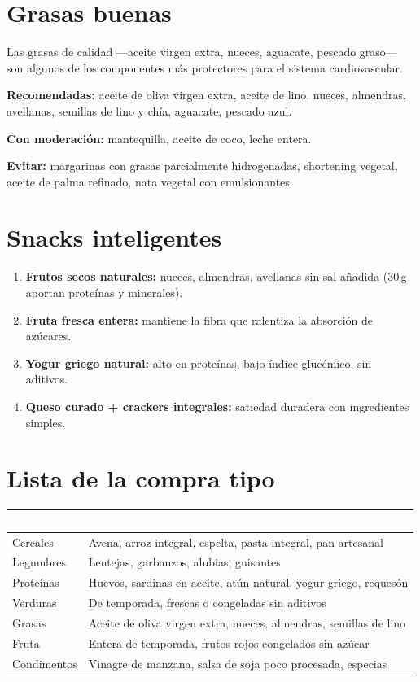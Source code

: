 \documentclass[a5paper,12pt,oneside,openany]{book}
\begin{document}
\section{Grasas buenas}

Las grasas de calidad ---aceite virgen extra, nueces, aguacate, pescado
graso--- son algunos de los componentes más protectores para el sistema
cardiovascular.

\textbf{Recomendadas:} aceite de oliva virgen extra, aceite de lino, nueces,
almendras, avellanas, semillas de lino y chía, aguacate, pescado azul.

\textbf{Con moderación:} mantequilla, aceite de coco, leche entera.

\textbf{Evitar:} margarinas con grasas parcialmente hidrogenadas, shortening
vegetal, aceite de palma refinado, nata vegetal con emulsionantes.

\section{Snacks inteligentes}

\begin{enumerate}
  \item \textbf{Frutos secos naturales:} nueces, almendras, avellanas sin sal
    añadida (30\,g aportan proteínas y minerales).
  \item \textbf{Fruta fresca entera:} mantiene la fibra que ralentiza la
    absorción de azúcares.
  \item \textbf{Yogur griego natural:} alto en proteínas, bajo índice
    glucémico, sin aditivos.
  \item \textbf{Queso curado + crackers integrales:} satiedad duradera con
    ingredientes simples.
\end{enumerate}

\section{Lista de la compra tipo}

{\small
\begin{tabularx}{\textwidth}{|l|L|}
\hline
{}
  \textcolor{white}{\textbf{Categoría}}
  & \textcolor{white}{\textbf{Productos recomendados}} \\
\hline
Cereales & Avena, arroz integral, espelta, pasta integral, pan artesanal \\
\hline
Legumbres & Lentejas, garbanzos, alubias, guisantes \\
\hline
Proteínas & Huevos, sardinas en aceite, atún natural, yogur griego, requesón \\
\hline
Verduras & De temporada, frescas o congeladas sin aditivos \\
\hline
Grasas & Aceite de oliva virgen extra, nueces, almendras, semillas de lino \\
\hline
Fruta & Entera de temporada, frutos rojos congelados sin azúcar \\
\hline
Condimentos & Vinagre de manzana, salsa de soja poco procesada, especias \\
\hline
\end{tabularx}
}
\end{document}
